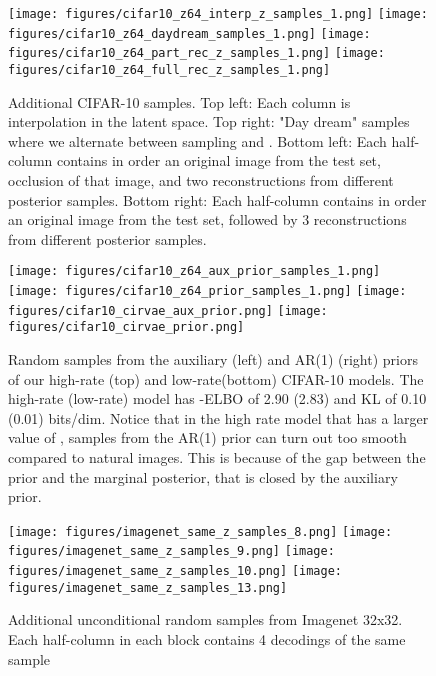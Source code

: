 \documentclass{article} \usepackage{iclr2019_conference,times}
\begin{document}
\begin{figure}[h!]
    \centering
    \texttt{[image: figures/cifar10\_z64\_interp\_z\_samples\_1.png]}
    \texttt{[image: figures/cifar10\_z64\_daydream\_samples\_1.png]}
    \texttt{[image: figures/cifar10\_z64\_part\_rec\_z\_samples\_1.png]}
    \texttt{[image: figures/cifar10\_z64\_full\_rec\_z\_samples\_1.png]}
    \label{fig:more-imagenet-samez}
    \caption{Additional CIFAR-10 samples. Top left: Each column is interpolation in the latent space.
     Top right: "Day dream" samples where we alternate between sampling  and .
     Bottom left: Each half-column contains in order an original image from the test set, occlusion of
     that image, and two reconstructions from different posterior samples.
     Bottom right: Each half-column contains in order an original image from the test set, followed by 3
     reconstructions from different posterior samples.}
\end{figure}


\begin{figure}[h!]
    \centering
    \texttt{[image: figures/cifar10\_z64\_aux\_prior\_samples\_1.png]}
    \texttt{[image: figures/cifar10\_z64\_prior\_samples\_1.png]}
    \texttt{[image: figures/cifar10\_cirvae\_aux\_prior.png]}
    \texttt{[image: figures/cifar10\_cirvae\_prior.png]}
    \label{fig:more-imagenet-samez}
    \caption{Random samples from the auxiliary (left) and AR(1) (right)  priors 
     of our high-rate (top) and low-rate(bottom) CIFAR-10 models.
     The high-rate (low-rate) model has -ELBO of 2.90 (2.83) and KL of 0.10 (0.01) bits/dim.
     Notice that in the high rate model that has a larger value of , samples from the AR(1)
     prior can turn out too smooth compared to natural images. This is because of the gap between the prior
     and the marginal posterior, that is closed by the auxiliary prior.}
\end{figure}



\begin{figure}[h!]
    \centering
    \texttt{[image: figures/imagenet\_same\_z\_samples\_8.png]}
    \texttt{[image: figures/imagenet\_same\_z\_samples\_9.png]}
    \texttt{[image: figures/imagenet\_same\_z\_samples\_10.png]}
    \texttt{[image: figures/imagenet\_same\_z\_samples\_13.png]}
    \label{fig:more-imagenet-samez}
    \caption{Additional unconditional random samples from Imagenet 32x32. 
    Each half-column in each block contains 4 decodings of the same sample }
\end{figure}
\end{document}
